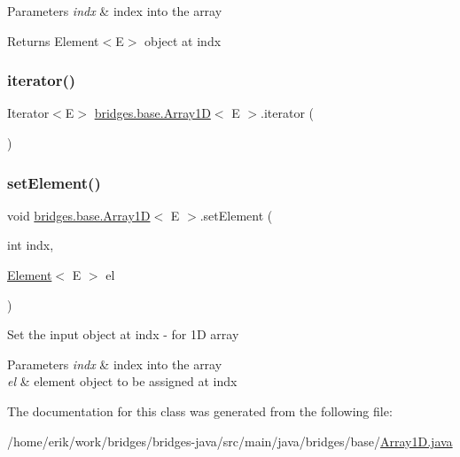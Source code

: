 \begin{DoxyParams}{Parameters}
{\em indx} & index into the array \\
\hline
\end{DoxyParams}
\begin{DoxyReturn}{Returns}
Element$<$\+E$>$ object at \textquotesingle{}indx\textquotesingle{} 
\end{DoxyReturn}
\mbox{\label{classbridges_1_1base_1_1_array1_d_aed723a9f55895c1673e73cb818be7c15}} 
\subsubsection{\texorpdfstring{iterator()}{iterator()}}
{\footnotesize\ttfamily Iterator$<$E$>$ \hyperlink{classbridges_1_1base_1_1_array1_d}{bridges.\+base.\+Array1D}$<$ E $>$.iterator (\begin{DoxyParamCaption}{ }\end{DoxyParamCaption})}

\mbox{\label{classbridges_1_1base_1_1_array1_d_ac749a6d97307998a2b37773456aca0fe}} 
\subsubsection{\texorpdfstring{set\+Element()}{setElement()}}
{\footnotesize\ttfamily void \hyperlink{classbridges_1_1base_1_1_array1_d}{bridges.\+base.\+Array1D}$<$ E $>$.set\+Element (\begin{DoxyParamCaption}\item[{int}]{indx,  }\item[{\hyperlink{classbridges_1_1base_1_1_element}{Element}$<$ E $>$}]{el }\end{DoxyParamCaption})}

Set the input object at \textquotesingle{}indx\textquotesingle{} -\/ for 1D array


\begin{DoxyParams}{Parameters}
{\em indx} & index into the array \\
\hline
{\em el} & element object to be assigned at \textquotesingle{}indx\textquotesingle{} \\
\hline
\end{DoxyParams}


The documentation for this class was generated from the following file\+:\begin{DoxyCompactItemize}
\item 
/home/erik/work/bridges/bridges-\/java/src/main/java/bridges/base/\hyperlink{_array1_d_8java}{Array1\+D.\+java}\end{DoxyCompactItemize}
